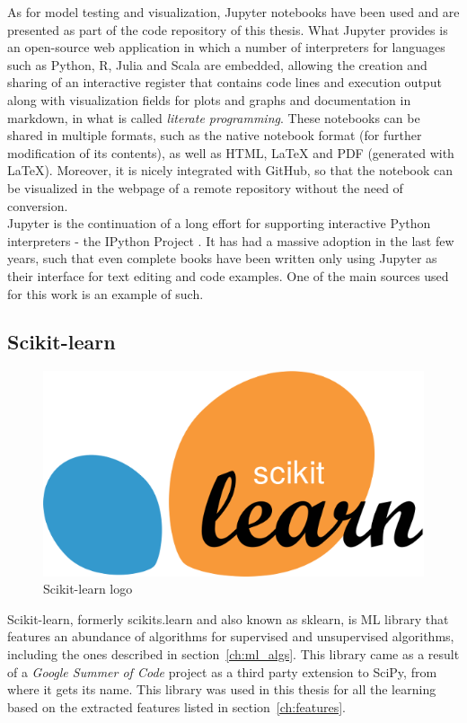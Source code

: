 As for model testing and visualization, Jupyter notebooks \cite{Jupyter} have been used and are presented as part of the code repository of this thesis. What Jupyter provides is an open-source web application in which a number of interpreters for languages such as Python, R, Julia and Scala are embedded, allowing the creation and sharing of an interactive register that contains code lines and execution output along with visualization fields for plots and graphs and documentation in markdown, in what is called \emph{literate programming}. These notebooks can be shared in multiple formats, such as the native notebook format (for further modification of its contents), as well as HTML, \LaTeX{} and PDF (generated with \LaTeX). Moreover, it is nicely integrated with GitHub, so that the notebook can be visualized in the webpage of a remote repository without the need of conversion.\\

Jupyter is the continuation of a long effort for supporting interactive Python interpreters - the IPython Project \cite{IPython}. It has had a massive adoption in the last few years, such that even complete books have been written only using Jupyter as their interface for text editing and code examples. One of the main sources used for this work \cite{Andreas} is an example of such.

\subsection{Scikit-learn}
\begin{figure}[!ht]
    \centering
    \includegraphics[width=0.4\linewidth]{figures/sklearn_logo}
    \caption{Scikit-learn logo}
    \label{fig:sklearn_logo}
\end{figure}
Scikit-learn, formerly scikits.learn and also known as sklearn, is \ac{ML} library that features an abundance of algorithms for supervised and unsupervised algorithms, including the ones described in section~\ref{ch:ml_algs}. This library came as a result of a \emph{Google Summer of Code} project as a third party extension to SciPy, from where it gets its name. This library was used in this thesis for all the learning based on the extracted features listed in section~\ref{ch:features}.

